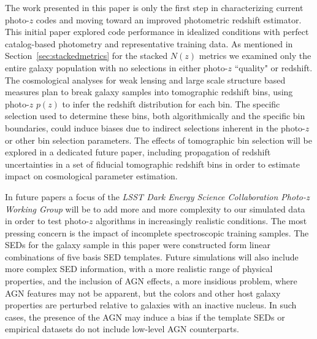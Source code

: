 The work presented in this paper is only the first step in characterizing current photo-$z$ codes and moving toward an improved photometric redshift estimator.
This initial paper explored code performance in idealized conditions with perfect catalog-based photometry and representative training data.
As mentioned in Section~\ref{sec:stackedmetrics} for the stacked $N(z)$ metrics we examined only the entire galaxy population with no selections in either photo-$z$ ``quality" or redshift.
The cosmological analyses for weak lensing and large scale structure based measures plan to break galaxy samples into tomographic redshift bins, using photo-$z$ $p(z)$ to infer the redshift distribution for each bin.
The specific selection used to determine these bins, both algorithmically and the specific bin boundaries, could induce biases due to indirect selections inherent in the photo-$z$ or other bin selection parameters.
The effects of tomographic bin selection will be explored in a dedicated future paper, including propagation of redshift uncertainties in a set of fiducial tomographic redshift bins in order to estimate impact on cosmological parameter estimation.


In future papers a focus of the {\it LSST Dark Energy Science Collaboration Photo-z Working Group} will be to add more and more complexity to our simulated data in order to test photo-$z$ algorithms in increasingly realistic conditions.
The most pressing concern is the impact of incomplete spectroscopic training samples.
The SEDs for the galaxy sample in this paper were constructed form linear combinations of five basis SED templates.
Future simulations will also include more complex SED information, with a more realistic range of physical properties, and the inclusion of AGN effects, a more insidious problem, where AGN features may not be apparent, but the colors and other host galaxy properties are perturbed relative to galaxies with an inactive nucleus.
In such cases, the presence of the AGN may induce a bias if the template SEDs or empirical datasets do not include low-level AGN counterparts.


